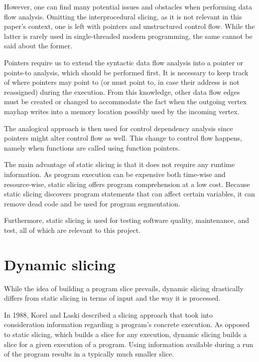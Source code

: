 However, one can find many potential issues and obstacles when performing 
data flow analysis. 
Omitting the interprocedural slicing, as it is not relevant in this paper's
context, one is left with pointers and unstructured control flow.
While the latter is rarely used in single-threaded modern programming, 
the same cannot be said about the former. 

Pointers require us to extend the syntactic data flow analysis 
into a pointer or points-to analysis, which should be performed first. 
It is necessary to keep track of where pointers may point to (or must point to,
in case their address is not reassigned) during the execution. 
From this knowledge, other data flow edges must be created or
changed to accommodate the fact when the outgoing vertex mayhap writes
into a memory location possibly used by the incoming vertex. 

The analogical approach is then used for control dependency analysis since 
pointers might alter control flow as well. 
This change to control flow happens, namely when functions are called using 
function pointers.

The main advantage of static slicing is that it does not require
any runtime information. 
As program execution can be expensive both time-wise and resource-wise, 
static slicing offers program comprehension at a low cost. 
Because static slicing discovers program statements that can affect 
certain variables, it can remove dead code and be used for program segmentation. 

Furthermore, static slicing is used for testing software quality, maintenance, 
and test, all of which are relevant to this project.

\section{Dynamic slicing}

While the idea of building a program slice prevails, dynamic slicing 
drastically differs from static slicing in terms of input and the way
it is processed. 

In 1988, Korel and Laski described a slicing approach that took into 
consideration information regarding a program's concrete execution. 
As opposed to static slicing, which builds a slice for any execution, 
dynamic slicing builds a slice for a given execution of a program. 
Using information available during a run of the program 
results in a typically much smaller slice.

